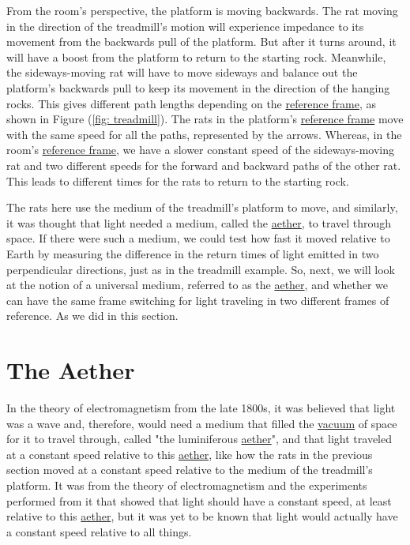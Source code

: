 From the room's perspective, the platform is moving backwards.
The rat moving in the direction of the treadmill's motion will experience impedance to its movement from the backwards pull of the platform.
But after it turns around, it will have a boost from the platform to return to the starting rock.
Meanwhile, the sideways-moving rat will have to move sideways and balance out the platform's backwards pull to keep its movement in the direction of the hanging rocks.
This gives different path lengths depending on the \hyperlink{def-Reference-frame}{reference frame}, as shown in Figure (\ref{fig: treadmill}).
The rats in the platform's \hyperlink{def-Reference-frame}{reference frame} move with the same speed for all the paths, represented by the arrows.
Whereas, in the room's \hyperlink{def-Reference-frame}{reference frame}, we have a slower constant speed of the sideways-moving rat and two different speeds for the forward and backward paths of the other rat.
This leads to different times for the rats to return to the starting rock.

The rats here use the medium of the treadmill's platform to move, and similarly, it was thought that light needed a medium, called the \hyperlink{def-aether}{aether}, to travel through space.
If there were such a medium, we could test how fast it moved relative to Earth by measuring the difference in the return times of light emitted in two perpendicular directions, just as in the treadmill example.
So, next, we will look at the notion of a universal medium, referred to as the \hyperlink{def-aether}{aether}, and whether we can have the same frame switching for light traveling in two different frames of reference.
As we did in this section.

\section{The Aether} \label{sect: The Aether}

In the theory of electromagnetism from the late 1800s, it was believed that light was a wave and, therefore, would need a medium that filled the \hyperlink{def-vacuum}{vacuum} of space for it to travel through, called "the luminiferous \hyperlink{def-aether}{aether}", and that light traveled at a constant speed relative to this \hyperlink{def-aether}{aether}, like how the rats in the previous section moved at a constant speed relative to the medium of the treadmill's platform.
It was from the theory of electromagnetism and the experiments performed from it that showed that light should have a constant speed, at least relative to this \hyperlink{def-aether}{aether}, but it was yet to be known that light would actually have a constant speed relative to all things.

